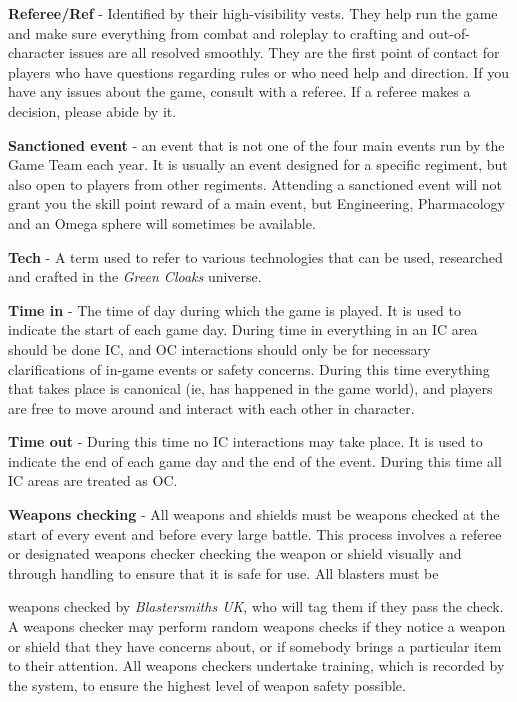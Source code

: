 \textbf{Referee/Ref} - Identified by their high-visibility vests. They help run the game and make sure everything from combat and roleplay to crafting and out-of-character issues are all resolved smoothly. They are the first point of contact for players who have questions regarding rules or who need help and direction. If you have any issues about the game, consult with a referee. If a referee makes a decision, please abide by it.

\textbf{Sanctioned event} - an event that is not one of the four main events run by the Game Team each year. It is usually an event designed for a specific regiment, but also open to players from other regiments. Attending a sanctioned event will not grant you the skill point reward of a main event, but Engineering, Pharmacology and an Omega sphere will sometimes be available.

\textbf{Tech} - A term used to refer to various technologies that can be used, researched and crafted in the \textit{Green Cloaks} universe.

\textbf{Time in} - The time of day during which the game is played. It is used to indicate the start of each game day. During time in everything in an IC area should be done IC, and OC interactions should only be for necessary clarifications of in-game events or safety concerns. During this time everything that takes place is canonical (ie, has happened in the game world), and players are free to move around and interact with each other in character.

\textbf{Time out} - During this time no IC interactions may take place. It is used to indicate the end of each game day and the end of the event. During this time all IC areas are treated as OC.

\textbf{Weapons checking} - All weapons and shields must be weapons checked at the start of every event and before every large battle. This process involves a referee or designated weapons checker checking the weapon or shield visually and through handling to ensure that it is safe for use. All blasters must be

weapons checked by \textit{Blastersmiths UK}, who will tag them if they pass the check. A weapons checker may perform random weapons checks if they notice a weapon or shield that they have concerns about, or if somebody brings a particular item to their attention. All weapons checkers undertake training, which is recorded by the system, to ensure the highest level of weapon safety possible.

